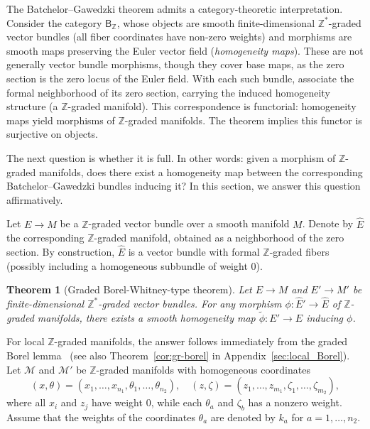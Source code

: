\documentclass[a4paper,12pt]{amsart}
\newtheorem{theorem}{Theorem}
\newcommand{\cM}{{\mathcal M}}
\newcommand{\Z}{{\mathbb Z}}
\newcommand{\wE}{\widehat{E}}
\begin{document}
\smallskip\noindent The Batchelor--Gawedzki theorem admits a category-theoretic interpretation. Consider the category $\mathsf{B}_\Z$, whose objects are smooth finite-dimensional $\Z^*$-graded vector bundles (all fiber coordinates have non-zero weights) and morphisms are smooth maps preserving the Euler vector field (\emph{homogeneity maps}). These are not generally vector bundle morphisms, though they cover base maps, as the zero section is the zero locus of the Euler field.
With each such bundle, associate the formal neighborhood of its zero section, carrying the induced homogeneity structure (a $\Z$-graded manifold). This correspondence is functorial: homogeneity maps yield morphisms of $\Z$-graded manifolds. The theorem implies this functor is surjective on objects.

\smallskip\noindent
The next question is whether it is full. In other words: given a morphism of $\Z$-graded manifolds, does there exist a homogeneity map between the corresponding Batchelor--Gawedzki bundles inducing it? In this section, we answer this question affirmatively.

\smallskip\noindent Let $E \to M$ be a $\Z$-graded vector bundle over a smooth manifold $M$. Denote by $\wE$ the corresponding $\Z$-graded manifold, obtained as a neighborhood of the zero section. By construction, $\wE$ is a vector bundle with formal $\Z$-graded fibers (possibly including a homogeneous subbundle of weight $0$).




\begin{theorem}[Graded Borel-Whitney-type theorem]\label{thm:Borel-Whitney}\normalfont
    Let $E\to M$ and $E'\to M'$ be finite-dimensional $\Z^*$-graded vector bundles. For any morphism $\phi\colon \wE'\to \wE$ of $\Z$-graded manifolds, there exists a smooth homogeneity map $\widetilde{\phi}\colon E'\to E$ inducing $\phi$.
\end{theorem}



\smallskip\noindent For local $\Z$-graded manifolds, the answer follows immediately from the graded Borel lemma~\cite{KS2024} (see also Theorem~\ref{cor:gr-borel} in Appendix~\ref{sec:local_Borel}). 
Let $\cM$ and $\cM'$ be $\Z$-graded manifolds with homogeneous coordinates 
\[
(x, \theta) = (x_1, \ldots, x_{n_1}, \theta_1, \ldots, \theta_{n_2}), 
\quad
(z, \zeta) = (z_1, \ldots, z_{m_1}, \zeta_1, \ldots, \zeta_{m_2}),
\]
where all $x_i$ and $z_j$ have weight $0$, while each $\theta_a$ and $\zeta_b$ has a nonzero weight. 
Assume that the weights of the coordinates $\theta_a$ are denoted by $k_a$ for $a = 1, \ldots, n_2$.
\end{document}
